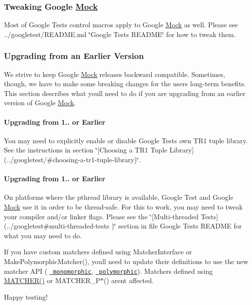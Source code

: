 \subsubsection*{Tweaking Google \mbox{\hyperlink{class_mock}{Mock}}}

Most of Google Test\textquotesingle{}s control macros apply to Google \mbox{\hyperlink{class_mock}{Mock}} as well. Please see ../googletest/\+R\+E\+A\+D\+ME.md \char`\"{}\+Google Test\textquotesingle{}s R\+E\+A\+D\+M\+E\char`\"{} for how to tweak them.

\subsubsection*{Upgrading from an Earlier Version}

We strive to keep Google \mbox{\hyperlink{class_mock}{Mock}} releases backward compatible. Sometimes, though, we have to make some breaking changes for the users\textquotesingle{} long-\/term benefits. This section describes what you\textquotesingle{}ll need to do if you are upgrading from an earlier version of Google \mbox{\hyperlink{class_mock}{Mock}}.

\paragraph*{Upgrading from 1.. or Earlier}

You may need to explicitly enable or disable Google Test\textquotesingle{}s own T\+R1 tuple library. See the instructions in section \char`\"{}\mbox{[}\+Choosing a T\+R1 Tuple
\+Library\mbox{]}(../googletest/\#choosing-\/a-\/tr1-\/tuple-\/library)\char`\"{}.

\paragraph*{Upgrading from 1.. or Earlier}

On platforms where the pthread library is available, Google Test and Google \mbox{\hyperlink{class_mock}{Mock}} use it in order to be thread-\/safe. For this to work, you may need to tweak your compiler and/or linker flags. Please see the \char`\"{}\mbox{[}\+Multi-\/threaded Tests\mbox{]}(../googletest\#multi-\/threaded-\/tests
)\char`\"{} section in file Google Test\textquotesingle{}s R\+E\+A\+D\+ME for what you may need to do.

If you have custom matchers defined using {\ttfamily Matcher\+Interface} or {\ttfamily Make\+Polymorphic\+Matcher()}, you\textquotesingle{}ll need to update their definitions to use the new matcher A\+PI ( \href{./docs/CookBook.md\#writing-new-monomorphic-matchers}{\texttt{ monomorphic}}, \href{./docs/CookBook.md\#writing-new-polymorphic-matchers}{\texttt{ polymorphic}}). Matchers defined using {\ttfamily \mbox{\hyperlink{googletest-master_2googlemock_2include_2gmock_2gmock-generated-matchers_8h_af4fe73ff8e2b0494f4970b575b65ddff}{M\+A\+T\+C\+H\+E\+R()}}} or {\ttfamily M\+A\+T\+C\+H\+E\+R\+\_\+\+P$\ast$()} aren\textquotesingle{}t affected.

Happy testing! 